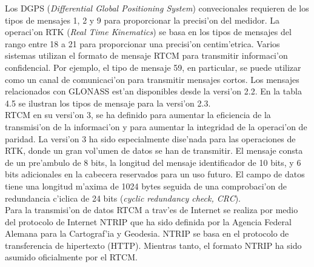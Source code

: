 Los DGPS (\emph{Differential Global Positioning System}) convecionales requieren de los tipos de mensajes 1, 2 y 9 para proporcionar la precisi'on del medidor. La operaci'on RTK (\emph{Real Time Kinematics}) se basa en los tipos de mensajes del rango entre 18 a 21 para proporcionar una precisi'on centim'etrica. Varios sistemas utilizan el formato de mensaje RTCM para transmitir informaci'on confidencial. Por ejemplo, el tipo de mensaje 59, en particular, se puede utilizar como un canal de comunicaci'on para transmitir mensajes cortos.
Los mensajes relacionados con GLONASS est'an disponibles desde la versi'on 2.2. En la tabla 4.5 se ilustran los tipos de mensaje para la versi'on 2.3.\\

RTCM en su versi'on 3, se ha definido para aumentar la eficiencia de la transmisi'on de la informaci'on y para aumentar la integridad de la operaci'on de paridad. La versi'on 3 ha sido especialmente dise'nada para las operaciones de RTK, donde un gran vol'umen de datos se han de transmitir. El mensaje consta de un pre'ambulo de 8 bits, la longitud del mensaje identificador de 10 bits, y 6 bits adicionales en la cabecera reservados para un uso futuro. El campo de datos tiene una longitud m'axima de 1024 bytes seguida de una comprobaci'on de redundancia c'iclica de 24 bits (\emph{cyclic redundancy check, CRC}).\\

Para la transmisi'on de datos RTCM a trav'es de Internet se realiza por medio del protocolo de Internet NTRIP que ha sido definida por la Agencia Federal Alemana para la Cartograf'ia y Geodesia. NTRIP se basa en el protocolo de transferencia de hipertexto (HTTP). Mientras tanto, el formato NTRIP ha sido asumido oficialmente por el RTCM.\\

